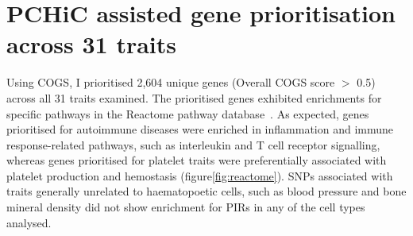 \documentclass[a4paper,11pt]{report}
\begin{document}
\section{PCHiC assisted gene prioritisation across 31 traits}
 
Using COGS, I prioritised 2,604  unique genes (Overall COGS score $>$ 0.5) across all 31 traits examined. The prioritised genes exhibited enrichments for specific pathways in the Reactome pathway database~\citep{FabregatSidiropoulosGarapatiEtAl2016}. As expected, genes prioritised for autoimmune diseases were enriched in inflammation and immune response-related pathways, such as interleukin and T cell receptor signalling, whereas genes prioritised for platelet traits were preferentially associated with platelet production and hemostasis (figure\ref{fig:reactome}). SNPs associated with traits generally unrelated to haematopoetic cells, such as blood pressure and bone mineral density did not show enrichment for PIRs in any of the cell types analysed. 





\end{document}
